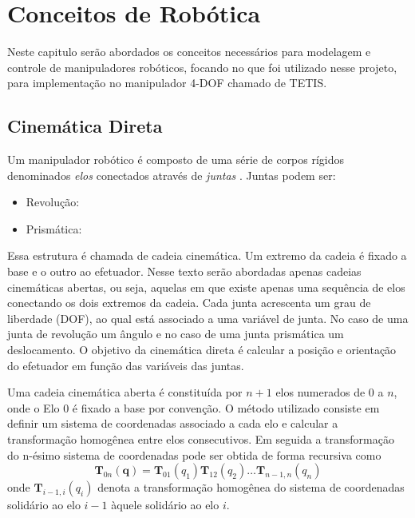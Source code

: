 \chapter{Conceitos de Robótica}
Neste capitulo serão abordados os conceitos necessários para modelagem e controle de manipuladores robóticos, focando no que foi utilizado nesse projeto, para implementação no manipulador 4-DOF chamado de TETIS.

\section{Cinemática Direta}
Um manipulador robótico é composto de uma série de corpos rígidos denominados \textit{elos} conectados através de \textit{juntas} \cite{siciliano}. 
Juntas podem ser:
\begin{itemize} 
\item Revolução: 
\item Prismática:
\end{itemize}

Essa estrutura é chamada de cadeia cinemática.
Um extremo da cadeia é fixado a base e o outro ao efetuador.
Nesse texto serão abordadas apenas cadeias cinemáticas abertas, ou seja, aquelas em que existe apenas uma sequência de elos conectando os dois extremos da cadeia.
Cada junta acrescenta um grau de liberdade (DOF), ao qual está associado a uma variável de junta. No caso de uma junta de revolução um ângulo e no caso de uma junta prismática um deslocamento.
O objetivo da cinemática direta é calcular a posição e orientação do efetuador em função das variáveis das juntas.


Uma cadeia cinemática aberta é constituída por $n+1$ elos numerados de $0$ a $n$, onde o Elo 0 é fixado a base por convenção. O método utilizado consiste em definir um sistema de coordenadas associado a cada elo e calcular a transformação homogênea entre elos consecutivos. Em seguida a transformação do n-ésimo sistema de coordenadas pode ser obtida de forma recursiva como
\begin{equation}\label{eq:cinedireta}
\bm{T}_{0n}(\bm{q}) = \bm{T}_{01}(q_1) \bm{T}_{12}(q_{2}) {\dots} \bm{T}_{n-1,n}(q_n)
\end{equation}
onde $\bm{T}_{i-1,i}(q_i)$ denota a transformação homogênea do sistema de coordenadas solidário ao elo $i-1$ àquele solidário ao elo $i$.

